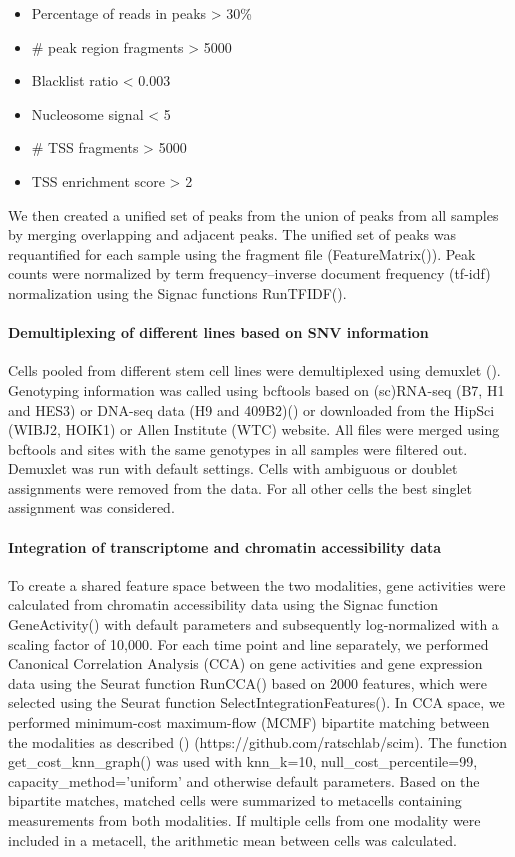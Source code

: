 \begin{itemize}
\item Percentage of reads in peaks > 30\% \
\item \# peak region fragments > 5000 \
\item Blacklist ratio < 0.003 \
\item Nucleosome signal < 5 \
\item \# TSS fragments > 5000 \
\item TSS enrichment score > 2 
\end{itemize} 

We then created a unified set of peaks from the union of peaks from all samples by merging overlapping and adjacent peaks. The unified set of peaks was requantified for each sample using the fragment file (FeatureMatrix()). Peak counts were normalized by term frequency–inverse document frequency (tf-idf) normalization using the Signac functions RunTFIDF().
 
\paragraph{Demultiplexing of different lines based on SNV information}
Cells pooled from different stem cell lines were demultiplexed using demuxlet (\cite{kang_multiplexed_2018}). Genotyping information was called using bcftools based on (sc)RNA-seq (B7, H1 and HES3) or DNA-seq data (H9 and 409B2)(\cite{riesenberg_simultaneous_2019,kanton_organoid_2019}) or downloaded from the HipSci (WIBJ2, HOIK1) or Allen Institute (WTC) website. All files were merged using bcftools and sites with the same genotypes in all samples were filtered out. Demuxlet was run with default settings. Cells with ambiguous or doublet assignments were removed from the data. For all other cells the best singlet assignment was considered.
 
\paragraph{Integration of transcriptome and chromatin accessibility data}
To create a shared feature space between the two modalities, gene activities were calculated from chromatin accessibility data using the Signac function GeneActivity() with default parameters and subsequently log-normalized with a scaling factor of 10,000. For each time point and line separately, we performed Canonical Correlation Analysis (CCA) on gene activities and gene expression data using the Seurat function RunCCA() based on 2000 features, which were selected using the Seurat function SelectIntegrationFeatures(). In CCA space, we performed minimum-cost maximum-flow (MCMF) bipartite matching between the modalities as described (\cite{stark_scim_2020}) (https://github.com/ratschlab/scim). The function get\_cost\_knn\_graph() was used with knn\_k=10, null\_cost\_percentile=99, capacity\_method=’uniform’ and otherwise default parameters. Based on the bipartite matches, matched cells were summarized to metacells containing measurements from both modalities. If multiple cells from one modality were included in a metacell, the arithmetic mean between cells was calculated.
 
